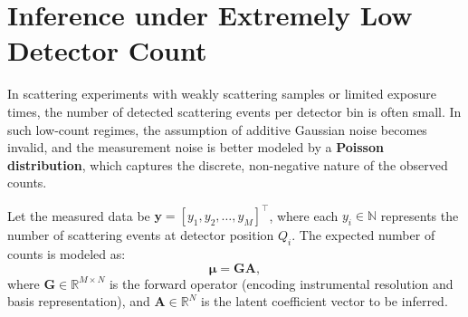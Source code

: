 \documentclass[12pt]{article}
\begin{document}



\clearpage
\section{Inference under Extremely Low Detector Count}
\label{sec:poisson}

In scattering experiments with weakly scattering samples or limited exposure times, the number of detected scattering events per detector bin is often small. In such low-count regimes, the assumption of additive Gaussian noise becomes invalid, and the measurement noise is better modeled by a \textbf{Poisson distribution}, which captures the discrete, non-negative nature of the observed counts.

Let the measured data be \( \mathbf{y} = [y_1, y_2, \dots, y_M]^\top \), where each \( y_i \in \mathbb{N} \) represents the number of scattering events at detector position \( Q_i \). The expected number of counts is modeled as:
\begin{equation}
    \boldsymbol{\mu} = \mathbf{G} \mathbf{A},
\end{equation}
where \( \mathbf{G} \in \mathbb{R}^{M \times N} \) is the forward operator (encoding instrumental resolution and basis representation), and \( \mathbf{A} \in \mathbb{R}^N \) is the latent coefficient vector to be inferred.
\end{document}
